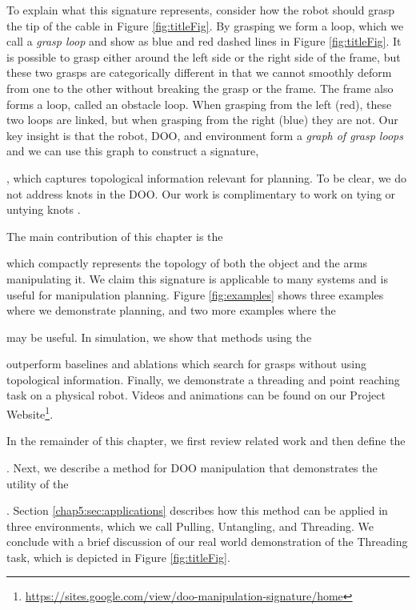 To explain what this signature represents, consider how the robot should grasp the tip of the cable in Figure \ref{fig:titleFig}. By grasping we form a loop, which we call a \textit{grasp loop} and show as blue and red dashed lines in Figure \ref{fig:titleFig}. It is possible to grasp either around the left side or the right side of the frame, but these two grasps are categorically different in that we cannot smoothly deform from one to the other without breaking the grasp or the frame. The frame also forms a loop, called an obstacle loop. When grasping from the left (red), these two loops are linked, but when grasping from the right (blue) they are not. Our key insight is that the robot, DOO, and environment form a \textit{graph of grasp loops} and we can use this graph to construct a signature, \signature{}, which captures topological information relevant for planning. To be clear, we do not address knots in the DOO. Our work is complimentary to work on tying or untying knots \cite{WakamatsuKnots2005, Saha07, UntanglingFull, WeifuKnots}.

The main contribution of this chapter is the \signature{} which compactly represents the topology of both the object and the arms manipulating it. We claim this signature is applicable to many systems and is useful for manipulation planning. Figure \ref{fig:examples} shows three examples where we demonstrate planning, and two more examples where the \signature{} may be useful. In simulation, we show that methods using the \signature{} outperform baselines and ablations which search for grasps without using topological information. Finally, we demonstrate a threading and point reaching task on a physical robot. Videos and animations can be found on our Project Website\footnote{\href{https://sites.google.com/view/doo-manipulation-signature/home}{https://sites.google.com/view/doo-manipulation-signature/home}}.

In the remainder of this chapter, we first review related work and then define the \signature{}. Next, we describe a method for DOO manipulation that demonstrates the utility of the \signature{}. Section \ref{chap5:sec:applications} describes how this method can be applied in three environments, which we call Pulling, Untangling, and Threading. We conclude with a brief discussion of our real world demonstration of the Threading task, which is depicted in Figure \ref{fig:titleFig}.
